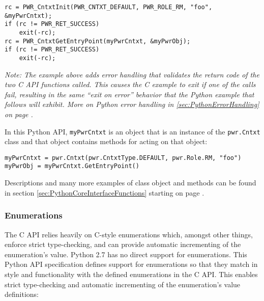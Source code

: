 \documentclass[12pt]{report} %
\begin{document}
\begin{appendices}
\begin{center}
\begin{minipage}{.95\linewidth}
\begin{lstlisting}
rc = PWR_CntxtInit(PWR_CNTXT_DEFAULT, PWR_ROLE_RM, "foo", &myPwrCntxt);
if (rc != PWR_RET_SUCCESS)
	exit(-rc);
rc = PWR_CntxtGetEntryPoint(myPwrCntxt, &myPwrObj);
if (rc != PWR_RET_SUCCESS)
	exit(-rc);
\end{lstlisting}\end{minipage}\end{center}

\emph{Note: The example above adds error handling that validates the return code of the two
C API functions called. This causes the C example to exit if one of the calls
fail, resulting in the same ``exit on error'' behavior that the Python example
that follows will exhibit. More on Python error handling in
\ref{sec:PythonErrorHandling} on page \pageref{sec:PythonErrorHandling}.}

In this Python API, \texttt{myPwrCntxt} is an object that is an instance of the
\texttt{pwr.Cntxt} class and that object contains methods for acting on that
object:

\begin{center}\begin{minipage}{.95\linewidth}\begin{lstlisting}
myPwrCntxt = pwr.Cntxt(pwr.CntxtType.DEFAULT, pwr.Role.RM, "foo")
myPwrObj = myPwrCntxt.GetEntryPoint()
\end{lstlisting}\end{minipage}\end{center}

Descriptions and many more examples of class object and methods can be found in
section \ref{sec:PythonCoreInterfaceFunctions} starting on page
\pageref{sec:PythonCoreInterfaceFunctions}.

\subsubsection{Enumerations}\label{sec:Enumerations}

The C API relies heavily on C-style enumerations which, amongst other things,
enforce strict type-checking, and can provide automatic incrementing of the
enumeration's value. Python 2.7 has no direct support for enumerations.  This
Python API specification defines support for enumerations so that they match in
style and functionality with the defined enumerations in the C API. This
enables strict type-checking and automatic incrementing of the enumeration's
value definitions:


\end{appendices}
\end{document}
